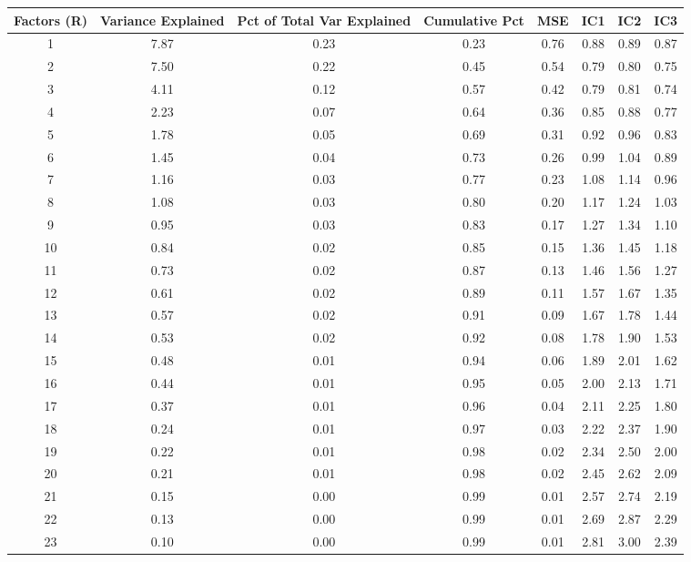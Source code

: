 \documentclass[11pt, letterpaper]{article}\usepackage[]{graphicx}\usepackage[]{color}
\begin{document}
\begin{table}[H]
\centering
\begingroup\scriptsize
\begin{tabular}{cccccccc}
  \hline
Factors (R) & Variance Explained & Pct of Total Var Explained & Cumulative Pct & MSE & IC1 & IC2 & IC3 \\ 
  \hline
  1 & 7.87 & 0.23 & 0.23 & 0.76 & 0.88 & 0.89 & 0.87 \\ 
    2 & 7.50 & 0.22 & 0.45 & 0.54 & 0.79 & 0.80 & 0.75 \\ 
    3 & 4.11 & 0.12 & 0.57 & 0.42 & 0.79 & 0.81 & 0.74 \\ 
    4 & 2.23 & 0.07 & 0.64 & 0.36 & 0.85 & 0.88 & 0.77 \\ 
    5 & 1.78 & 0.05 & 0.69 & 0.31 & 0.92 & 0.96 & 0.83 \\ 
    6 & 1.45 & 0.04 & 0.73 & 0.26 & 0.99 & 1.04 & 0.89 \\ 
    7 & 1.16 & 0.03 & 0.77 & 0.23 & 1.08 & 1.14 & 0.96 \\ 
    8 & 1.08 & 0.03 & 0.80 & 0.20 & 1.17 & 1.24 & 1.03 \\ 
    9 & 0.95 & 0.03 & 0.83 & 0.17 & 1.27 & 1.34 & 1.10 \\ 
   10 & 0.84 & 0.02 & 0.85 & 0.15 & 1.36 & 1.45 & 1.18 \\ 
   11 & 0.73 & 0.02 & 0.87 & 0.13 & 1.46 & 1.56 & 1.27 \\ 
   12 & 0.61 & 0.02 & 0.89 & 0.11 & 1.57 & 1.67 & 1.35 \\ 
   13 & 0.57 & 0.02 & 0.91 & 0.09 & 1.67 & 1.78 & 1.44 \\ 
   14 & 0.53 & 0.02 & 0.92 & 0.08 & 1.78 & 1.90 & 1.53 \\ 
   15 & 0.48 & 0.01 & 0.94 & 0.06 & 1.89 & 2.01 & 1.62 \\ 
   16 & 0.44 & 0.01 & 0.95 & 0.05 & 2.00 & 2.13 & 1.71 \\ 
   17 & 0.37 & 0.01 & 0.96 & 0.04 & 2.11 & 2.25 & 1.80 \\ 
   18 & 0.24 & 0.01 & 0.97 & 0.03 & 2.22 & 2.37 & 1.90 \\ 
   19 & 0.22 & 0.01 & 0.98 & 0.02 & 2.34 & 2.50 & 2.00 \\ 
   20 & 0.21 & 0.01 & 0.98 & 0.02 & 2.45 & 2.62 & 2.09 \\ 
   21 & 0.15 & 0.00 & 0.99 & 0.01 & 2.57 & 2.74 & 2.19 \\ 
   22 & 0.13 & 0.00 & 0.99 & 0.01 & 2.69 & 2.87 & 2.29 \\ 
   23 & 0.10 & 0.00 & 0.99 & 0.01 & 2.81 & 3.00 & 2.39 \\ 

\end{tabular}
\end{table}
\end{document}
